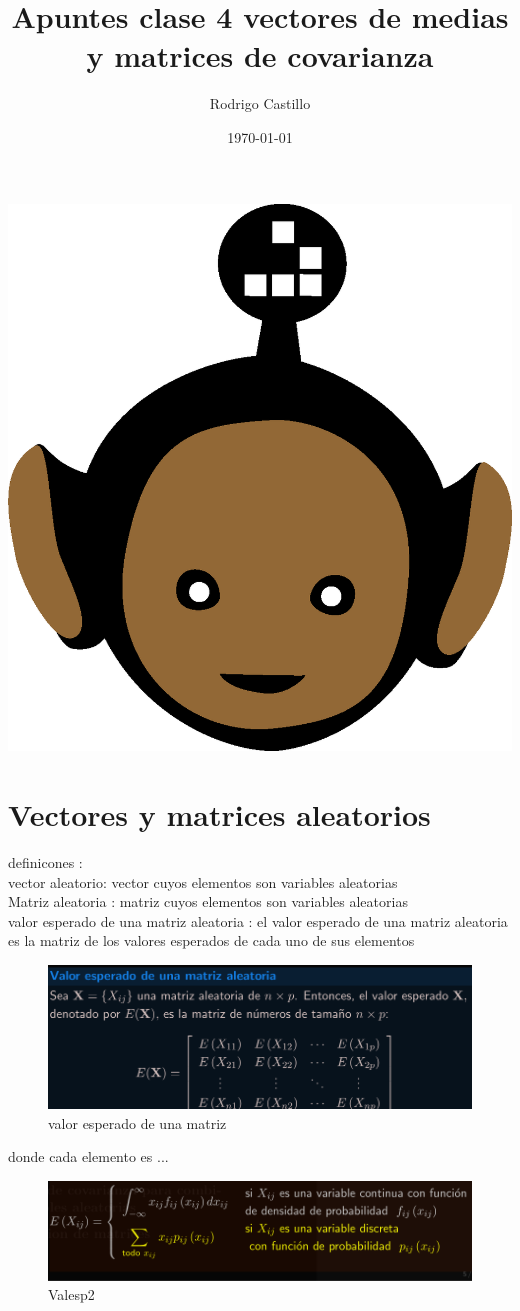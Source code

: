 \documentclass[10pt,a4paper]{article} %
\begin{document}
    \title{{  Apuntes clase 4 vectores de medias y matrices de covarianza  }}
    \author{{Rodrigo Castillo}}
    \date{\today}

    \maketitle


    \includegraphics[width=0.1\linewidth]{negro_cara.png}
    \section{Vectores y matrices aleatorios}
        definicones :
        \\ vector aleatorio: \color{red} vector cuyos elementos son variables
        aleatorias \color{white}
        \\ Matriz aleatoria : \color{red} matriz cuyos elementos son variables
        aleatorias \color{white}
        \\ valor esperado de una matriz aleatoria : \color{red} el valor
        esperado de una matriz aleatoria es la matriz de los valores esperados
        de cada uno de sus elementos \color{white}

        \begin{figure}[h!]
            \centering
            \includegraphics[width=0.8\linewidth]{valesp.png}
            \caption{valor esperado de una matriz}
            \label{fig:valesp}
        \end{figure}

        donde cada elemento es ...

        \begin{figure}[h!]
            \centering
            \includegraphics[width=0.8\linewidth]{valesp2.png}
            \caption{Valesp2}
            \label{fig:valesp2}
        \end{figure}
\end{document}

